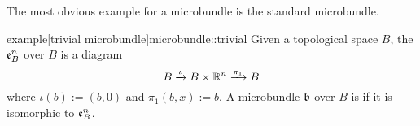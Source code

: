 \begin{myparagraph}
    The most obvious example for a microbundle is the standard microbundle.
\end{myparagraph}

\begin{mystatement}{example}[trivial microbundle]{microbundle::trivial}
    Given a topological space $B$, the  $\mathfrak{e}^{n}_{B}$ over $B$ is a diagram
    \[ B \xrightarrow{\iota} B \times \mathbb{R}^n \xrightarrow{\pi_1} B{} \]
    where $\iota(b) := (b, 0)$ and $\pi_1(b, x) := b$.
    A microbundle $\bb$ over $B$ is  if it is isomorphic to $\mathfrak{e}^{n}_{B}$.
\end{mystatement}